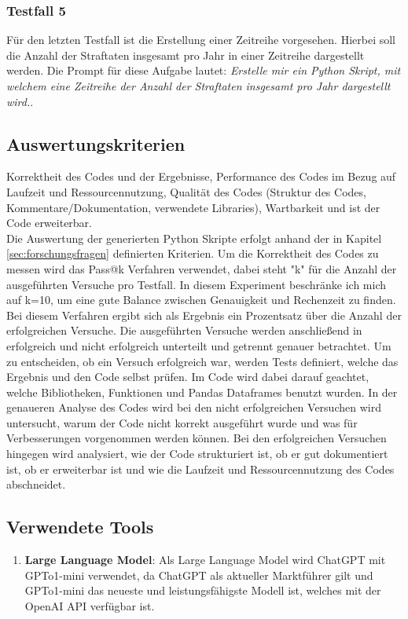 \documentclass[11pt,a4paper]{article}
\begin{document}
\subsubsection{Testfall 5}
    Für den letzten Testfall ist die Erstellung einer Zeitreihe vorgesehen. Hierbei soll die Anzahl der Straftaten insgesamt pro Jahr in einer Zeitreihe dargestellt werden. Die Prompt für diese Aufgabe lautet: \emph{Erstelle mir ein Python Skript, mit welchem eine Zeitreihe der Anzahl der Straftaten insgesamt pro Jahr dargestellt wird.}.


\subsection{Auswertungskriterien}
\label{sec:auswertungskriterien}
    Korrektheit des Codes und der Ergebnisse, Performance des Codes im Bezug auf Laufzeit und Ressourcennutzung, Qualität des Codes (Struktur des Codes, Kommentare/Dokumentation, verwendete Libraries), Wartbarkeit und ist der Code erweiterbar.\\

    Die Auswertung der generierten Python Skripte erfolgt anhand der in Kapitel \ref{sec:forschungsfragen} definierten Kriterien. Um die Korrektheit des Codes zu messen wird das Pass@k Verfahren verwendet, dabei steht "k" für die Anzahl der ausgeführten Versuche pro Testfall. In diesem Experiment beschränke ich mich auf k=10, um eine gute Balance zwischen Genauigkeit und Rechenzeit zu finden. Bei diesem Verfahren ergibt sich als Ergebnis ein Prozentsatz über die Anzahl der erfolgreichen Versuche. Die ausgeführten Versuche werden anschließend in erfolgreich und nicht erfolgreich unterteilt und getrennt genauer betrachtet. Um zu entscheiden, ob ein Versuch erfolgreich war, werden Tests definiert, welche das Ergebnis und den Code selbst prüfen. Im Code wird dabei darauf geachtet, welche Bibliotheken, Funktionen und Pandas Dataframes benutzt wurden.
    In der genaueren Analyse des Codes wird bei den nicht erfolgreichen Versuchen wird untersucht, warum der Code nicht korrekt ausgeführt wurde und was für Verbesserungen vorgenommen werden können. Bei den erfolgreichen Versuchen hingegen wird analysiert, wie der Code strukturiert ist, ob er gut dokumentiert ist, ob er erweiterbar ist und wie die Laufzeit und Ressourcennutzung des Codes abschneidet.

\subsection{Verwendete Tools}
    \begin{enumerate}
        \item \textbf{Large Language Model}: Als Large Language Model wird ChatGPT mit GPTo1-mini verwendet, da ChatGPT als aktueller Marktführer gilt und GPTo1-mini das neueste und leistungsfähigste Modell ist, welches mit der OpenAI API verfügbar ist.
        
    \end{enumerate}
\end{document}
